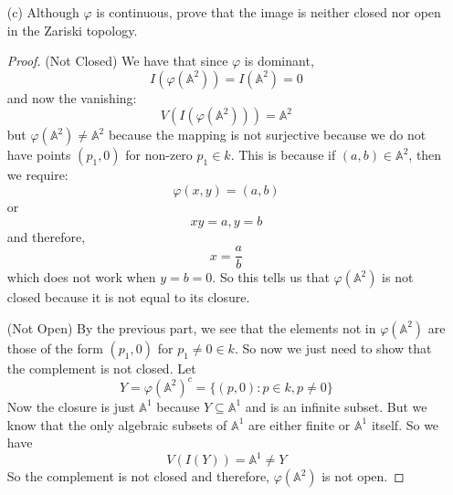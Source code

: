 \documentclass{article}
\begin{document}
\begin{itemize}
        \item [(c)] Although $\varphi$ is continuous, prove that the image is neither closed nor open in the Zariski topology. 
            \begin{proof}
                (Not Closed) We have that since $\varphi$ is dominant, 
                    \begin{equation*}
                        I(\varphi(\mathbb{A}^{2})) = I(\mathbb{A}^{2}) = 0
                    \end{equation*}
                and now the vanishing:
                    \begin{equation*}
                        V(I(\varphi(\mathbb{A}^{2}))) = \mathbb{A}^{2}
                    \end{equation*}
                but $\varphi(\mathbb{A}^{2}) \neq \mathbb{A}^{2}$ because the mapping is not surjective because we do not have points $(p_{1}, 0)$ for non-zero $p_{1} \in k$. This is because if $(a, b) \in \mathbb{A}^{2}$, then we require:
                    \begin{equation*}
                        \varphi(x, y) = (a, b)
                    \end{equation*}
                or 
                    \begin{equation*}
                        xy = a, y = b
                    \end{equation*}
                and therefore,  
                    \begin{equation*}
                        x = \dfrac{a}{b}
                    \end{equation*}
                which does not work when $y = b = 0$. So this tells us that $\varphi(\mathbb{A}^{2})$ is not closed because it is not equal to its closure. 

                (Not Open) By the previous part, we see that the elements not in $\varphi(\mathbb{A}^{2})$ are those of the form $(p_{1}, 0)$ for $p_{1} \neq 0 \in k$. So now we just need to show that the complement is not closed. Let
                    \begin{equation*}
                        Y = \varphi(\mathbb{A}^{2})^{c} = \{(p, 0): p \in k, p \neq 0\}
                    \end{equation*}
                Now the closure is just $\mathbb{A}^{1}$ because $Y \subseteq \mathbb{A}^{1}$ and is an infinite subset. But we know that the only algebraic subsets of $\mathbb{A}^{1}$ are either finite or $\mathbb{A}^{1}$ itself. So we have 
                    \begin{equation*}
                        V(I(Y)) = \mathbb{A}^{1} \neq Y
                    \end{equation*}
                So the complement is not closed and therefore, $\varphi(\mathbb{A}^{2})$ is not open.
            \end{proof}
    \end{itemize}
\end{document}
